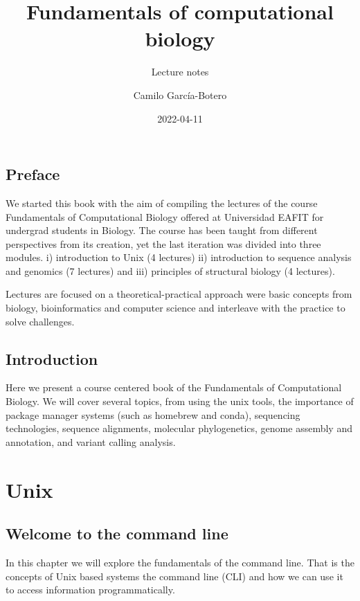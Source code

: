\documentclass[
  letterpaper,
  DIV=11,
  numbers=noendperiod]{scrreprt}
\title{Fundamentals of computational biology}
\subtitle{Lecture notes}
\author{Camilo García-Botero}
\date{2022-04-11}
\renewcommand*\contentsname{Table of contents}
\begin{document}
\maketitle

\renewcommand*\contentsname{Table of contents}
{
\hypersetup{linkcolor=}
\setcounter{tocdepth}{1}
\tableofcontents
}
\hypertarget{preface}{%
\chapter*{Preface}\label{preface}}

We started this book with the aim of compiling the lectures of the
course Fundamentals of Computational Biology offered at Universidad
EAFIT for undergrad students in Biology. The course has been taught from
different perspectives from its creation, yet the last iteration was
divided into three modules. i) introduction to Unix (4 lectures) ii)
introduction to sequence analysis and genomics (7 lectures) and iii)
principles of structural biology (4 lectures).

Lectures are focused on a theoretical-practical approach were basic
concepts from biology, bioinformatics and computer science and
interleave with the practice to solve challenges.

\hypertarget{introduction}{%
\chapter*{Introduction}\label{introduction}}

Here we present a course centered book of the Fundamentals of
Computational Biology. We will cover several topics, from using the unix
tools, the importance of package manager systems (such as homebrew and
conda), sequencing technologies, sequence alignments, molecular
phylogenetics, genome assembly and annotation, and variant calling
analysis.

\part{Unix}

\hypertarget{welcome-to-the-command-line}{%
\chapter{Welcome to the command
line}\label{welcome-to-the-command-line}}

In this chapter we will explore the fundamentals of the command line.
That is the concepts of Unix based systems the command line (CLI) and
how we can use it to access information programmatically.
\end{document}
